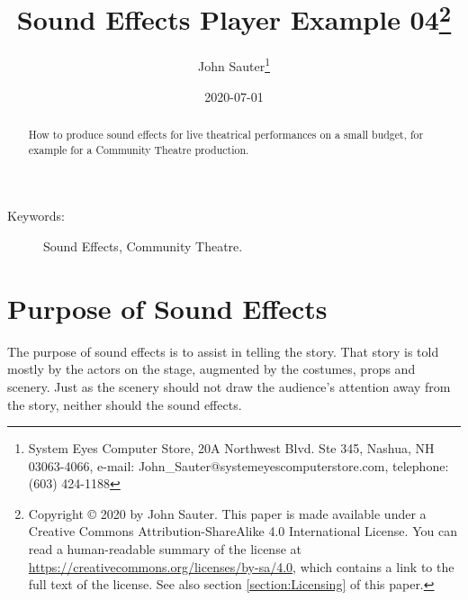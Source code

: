 \documentclass[letterpaper,twoside]{article}
\begin{document}
\title{Sound Effects Player Example 04\footnote{Copyright
    {\copyright} 2020 by John Sauter.
    This paper is made available under a
    Creative Commons Attribution-ShareAlike 4.0 International License.
    You can read a human-readable summary of the license at
    \url{https://creativecommons.org/licenses/by-sa/4.0}, which contains
    a link to the full text of the license.
    See also section \ref{section:Licensing} of this paper.}
}
\author{John Sauter\footnote{
    System Eyes Computer Store,
    20A Northwest Blvd.  Ste 345,
    Nashua, NH  03063-4066,
    e-mail: John\_Sauter@systemeyescomputerstore.com,
    telephone: (603) 424-1188}}
\date{2020-07-01}
\maketitle
\begin{abstract}
  How to produce sound effects for live theatrical performances
  on a small budget,
  for example for a Community Theatre production.
\end{abstract}
\begin{description}
\item[Keywords:]Sound Effects, Community Theatre.
\end{description}
  
\newpage
\section{Purpose of Sound Effects}
The purpose of sound effects is to assist in telling the story.
That story is told mostly by the actors on the stage, augmented
by the costumes, props and scenery.  Just as the scenery should
not draw the audience's attention away from the story, neither
should the sound effects.
\end{document}
